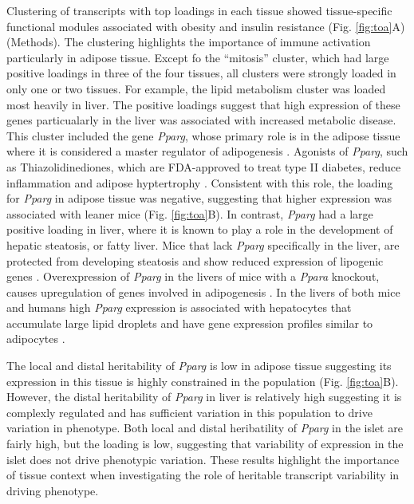 \documentclass[
]{article}
\begin{document}
Clustering of transcripts with top loadings in each tissue showed
tissue-specific functional modules associated with obesity and insulin
resistance (Fig. \ref{fig:toa}A) (Methods). The clustering highlights
the importance of immune activation particularly in adipose tissue.
Except fo the ``mitosis'' cluster, which had large positive loadings in
three of the four tissues, all clusters were strongly loaded in only one
or two tissues. For example, the lipid metabolism cluster was loaded
most heavily in liver. The positive loadings suggest that high
expression of these genes particualarly in the liver was associated with
increased metabolic disease. This cluster included the gene
\textit{Pparg}, whose primary role is in the adipose tissue where it is
considered a master regulator of adipogenesis \cite{pmid17389767}.
Agonists of \textit{Pparg}, such as Thiazolidinediones, which are
FDA-approved to treat type II diabetes, reduce inflammation and adipose
hyptertrophy \cite{pmid17389767}. Consistent with this role, the loading
for \textit{Pparg} in adipose tissue was negative, suggesting that
higher expression was associated with leaner mice (Fig. \ref{fig:toa}B).
In contrast, \textit{Pparg} had a large positive loading in liver, where
it is known to play a role in the development of hepatic steatosis, or
fatty liver. Mice that lack \textit{Pparg} specifically in the liver,
are protected from developing steatosis and show reduced expression of
lipogenic genes \cite{pmid12805374, pmid12618528}. Overexpression of
\textit{Pparg} in the livers of mice with a \textit{Ppara} knockout,
causes upregulation of genes involved in adipogenesis
\cite{pmid16357043}. In the livers of both mice and humans high
\textit{Pparg} expression is associated with hepatocytes that accumulate
large lipid droplets and have gene expression profiles similar to
adipocytes \cite{pmid15644454, pmid16403437}.

The local and distal heritability of \textit{Pparg} is low in adipose
tissue suggesting its expression in this tissue is highly constrained in
the population (Fig. \ref{fig:toa}B). However, the distal heritability
of \textit{Pparg} in liver is relatively high suggesting it is complexly
regulated and has sufficient variation in this population to drive
variation in phenotype. Both local and distal heribatility of
\textit{Pparg} in the islet are fairly high, but the loading is low,
suggesting that variability of expression in the islet does not drive
phenotypic variation. These results highlight the importance of tissue
context when investigating the role of heritable transcript variability
in driving phenotype.
\end{document}
